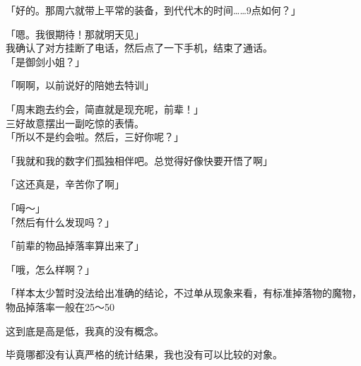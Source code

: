 「好的。那周六就带上平常的装备，到代代木的时间……9点如何？」

「嗯。我很期待！那就明天见」\\

我确认了对方挂断了电话，然后点了一下手机，结束了通话。\\

「是御剑小姐？」

「啊啊，以前说好的陪她去特训」

「周末跑去约会，简直就是现充呢，前辈！」\\

三好故意摆出一副吃惊的表情。\\

「所以不是约会啦。然后，三好你呢？」

「我就和我的数字们孤独相伴吧。总觉得好像快要开悟了啊」

「这还真是，辛苦你了啊」

「呣～」\\

「然后有什么发现吗？」

「前辈的物品掉落率算出来了」

「哦，怎么样啊？」

「样本太少暂时没法给出准确的结论，不过单从现象来看，有标准掉落物的魔物，物品掉落率一般在25～50%

这到底是高是低，我真的没有概念。

毕竟哪都没有认真严格的统计结果，我也没有可以比较的对象。\\

